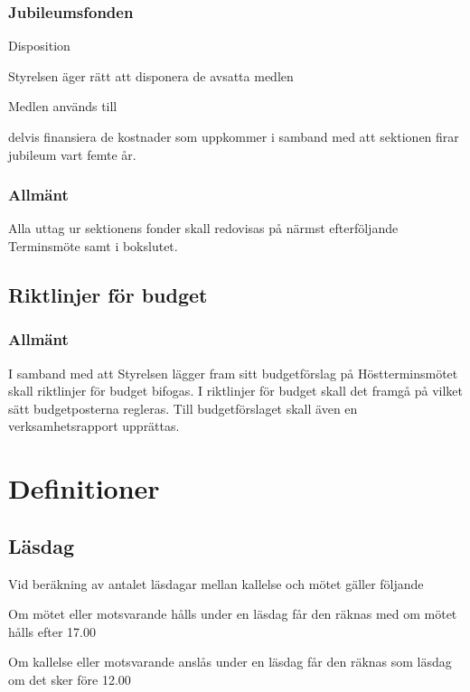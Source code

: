 \documentclass[10pt]{article}
\renewcommand{\thesubsection}{\arabic{section}:\Alph{subsection}}
\begin{document}
\subsubsection{Jubileumsfonden}
\begin{emptylist}
\item Disposition
    \begin{dashlist}
    \item Styrelsen äger rätt att disponera de avsatta medlen
    \end{dashlist}
\end{emptylist}
\begin{emptylist}
\item Medlen används till
    \begin{dashlist}
    \item delvis finansiera de kostnader som uppkommer i samband med att sektionen firar jubileum vart femte år.
    \end{dashlist}
\end{emptylist}

\subsubsection{Allmänt}

Alla uttag ur sektionens fonder skall redovisas på närmst efterföljande
Terminsmöte samt i bokslutet.

\subsection{Riktlinjer för budget}

\subsubsection{Allmänt}

I samband med att Styrelsen lägger fram sitt budgetförslag på Höstterminsmötet skall riktlinjer för budget bifogas. I riktlinjer för budget skall det framgå
på vilket sätt budgetposterna regleras. Till budgetförslaget skall även en verksamhetsrapport upprättas.

\renewcommand*\thesubsection{\arabic{section}:\Alph{subsection}}
\section{Definitioner}

\subsection{Läsdag}
Vid beräkning av antalet läsdagar mellan kallelse och mötet gäller följande
\begin{emptylist}
\item Om mötet eller motsvarande hålls under en läsdag får den räknas med om
    mötet hålls efter 17.00
\item Om kallelse eller motsvarande anslås under en läsdag får den räknas som
    läsdag om det sker före 12.00
\end{emptylist}
\end{document}
